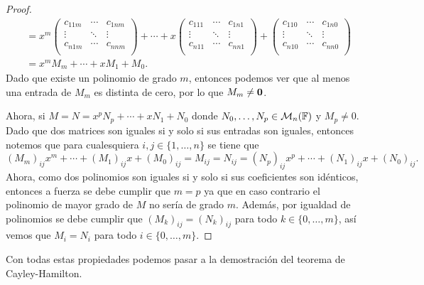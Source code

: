 \begin{proof}
\begin{align*}
      &= x^m \begin{pmatrix}
        c_{11m} & \cdots & c_{1nm}   \\
        \vdots & \ddots & \vdots \\
        c_{n1m}  & \cdots & c_{nnm}  \\
        \end{pmatrix} + 
        \cdots
        + x \begin{pmatrix}
         c_{111} & \cdots &  c_{1n1} \\
        \vdots & \ddots & \vdots \\
         c_{n11}  & \cdots &  c_{nn1} \\
        \end{pmatrix}
        +\begin{pmatrix}
        c_{110} & \cdots &  c_{1n0}  \\
        \vdots & \ddots & \vdots \\
         c_{n10} & \cdots & c_{nn0}  \\
        \end{pmatrix} \\
      &= x^m M_m + \cdots + x M_1 + M_0.
    \end{align*}
  Dado que existe un polinomio de grado $m$, entonces podemos ver que al menos una entrada de $M_m$ es distinta de cero, por lo que $M_m \neq\mathbf{0}$.

  Ahora, si $M = N = x^p N_p + \cdots + x N_1  + N_0$ donde $N_0, \ldots, N_p \in \mathcal{M}_n(\mathbb{F})$ y $M_p \neq 0$. Dado que dos matrices son iguales si y solo si sus entradas son iguales, entonces notemos que para cualesquiera $i,j \in \{1,\ldots,n\}$ se tiene que
    \[
      (M_m)_{ij} x^m + \cdots + (M_1)_{ij}x + (M_0)_{ij} = M_{ij}
        =
      N_{ij} = (N_p)_{ij} x^p + \cdots + (N_1)_{ij}x + (N_0)_{ij}.
    \]
  Ahora, como dos polinomios son iguales si y solo si sus coeficientes son idénticos, entonces a fuerza se debe cumplir que $m = p$ ya que en caso contrario el polinomio de mayor grado de $M$ no sería de grado $m$. Además, por igualdad de polinomios se debe cumplir que $(M_k)_{ij} = (N_k)_{ij}$ para todo $k \in \{0,\ldots,m\}$, así vemos que $M_i = N_i$ para todo $i \in \{0,\ldots, m\}$.
\end{proof}

Con todas estas propiedades podemos pasar a la demostración del teorema de Cayley-Hamilton.

